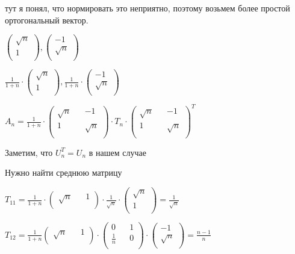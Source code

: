 \documentclass[a4paper, 11pt]{article}
\begin{document}
\begin{enumerate}
\begin{enumerate}
			тут я понял, что нормировать это неприятно, поэтому возьмем более простой ортогональный вектор.
			
			
			$\begin{pmatrix}
				\sqrt{n} \\
				1 \\
			\end{pmatrix}, \begin{pmatrix}
			-1 \\
			\sqrt{n} \\
		\end{pmatrix}$
	
			$\frac{1}{1 + n} \cdot \begin{pmatrix}
				\sqrt{n} \\
				1 \\
			\end{pmatrix}, \frac{1}{1 + n} \cdot\begin{pmatrix}
				-1 \\
				\sqrt{n} \\
			\end{pmatrix}$
		
		
			$A_n = \frac{1}{1 + n} \cdot \begin{pmatrix}
				\sqrt{n} && -1 \\
				1 && \sqrt{n} \\
			\end{pmatrix} \cdot T_n \cdot \begin{pmatrix}
			\sqrt{n} && -1 \\
			1 && \sqrt{n} \\
		\end{pmatrix}^T$
	
		
		Заметим, что $U_n^T = U_n$ в нашем случае
		
		Нужно найти среднюю матрицу
		
		$T_{11} = \frac{1}{1 + n} \cdot \begin{pmatrix}
			\sqrt{n} && 1 \\ 
		\end{pmatrix} \cdot \frac{1}{\sqrt{n}} \cdot \begin{pmatrix}
		\sqrt{n} \\ 
		1 \\
	\end{pmatrix} = \frac{1}{\sqrt{n}}$

		$T_{12} = \frac{1}{1 + n} \begin{pmatrix}
			\sqrt{n} && 1 \\ 
		\end{pmatrix} \cdot \begin{pmatrix}
		0 && 1 \\
		\frac{1}{n} && 0 \\
		\end{pmatrix} \cdot \begin{pmatrix}
			-1 \\
			\sqrt{n} \\
		\end{pmatrix} = \frac{n - 1}{n}$
	

\end{enumerate}
\end{enumerate}
\end{document}
